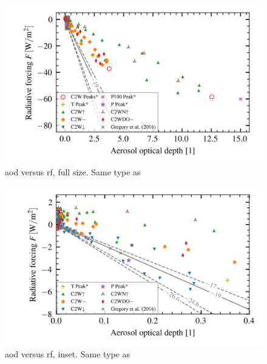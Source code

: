 \documentclass{ametsocV5}
\begin{document}
\begin{figure}[t]
  \begin{center}
    \includegraphics[width=0.95\linewidth]{figures/aod_vs_toa_avg_full.png}
  \end{center}
  \caption{\acrshort{aod} versus \acrshort{rf}, full size. Same type as
    \citet{gregory2016}}%
  \label{fig:aod_vs_toa_full}
\end{figure}

\begin{figure}[t]
  \begin{center}
    \includegraphics[width=0.95\linewidth]{figures/aod_vs_toa_avg_inset.png}
  \end{center}
  \caption{\acrshort{aod} versus \acrshort{rf}, inset. Same type as
    \citet{gregory2016}}%
  \label{fig:aod_vs_toa_inset}
\end{figure}

\end{document}
